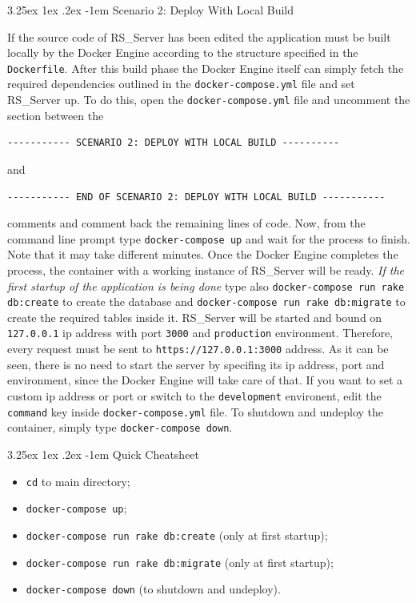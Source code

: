 \documentclass[a4paper, english]{article}
\makeatletter
\renewcommand\paragraph{\@startsection{paragraph}{5}{\z@}%
  {3.25ex \@plus1ex \@minus.2ex}%
  {-1em}%
  {\normalfont\normalsize\bfseries}}
\makeatother
\begin{document}
\paragraph{Scenario 2: Deploy With Local Build}

If the source code of RS\_Server has been edited the application must be built locally by the Docker Engine according to the structure specified in the \verb|Dockerfile|. After this build phase the Docker Engine itself can simply fetch the required dependencies outlined in the \verb|docker-compose.yml| file and set RS\_Server up. To do this, open the \verb|docker-compose.yml| file and uncomment the section between the 
\begin{verbatim}
----------- SCENARIO 2: DEPLOY WITH LOCAL BUILD ----------
\end{verbatim}
and 
\begin{verbatim}
----------- END OF SCENARIO 2: DEPLOY WITH LOCAL BUILD -----------
\end{verbatim} 
comments and comment back the remaining lines of code. Now, from the command line prompt type \verb|docker-compose up| and wait for the process to finish. Note that it may take different minutes. Once the Docker Engine completes the process, the container with a working instance of RS\_Server will be ready. \emph{If the first startup of the application is being done} type also \verb|docker-compose run rake db:create| to create the database and \verb|docker-compose run rake db:migrate| to create the required tables inside it. RS\_Server will be started and bound on \verb|127.0.0.1| ip address with port \verb|3000| and \verb|production| environment. Therefore, every request must be sent to \verb|https://127.0.0.1:3000| address. As it can be seen, there is no need to start the server by specifing its ip address, port and environment, since the Docker Engine will take care of that. If you want to set a custom ip address or port or switch to the \verb|development| environent, edit the \verb|command| key inside \verb|docker-compose.yml| file. To shutdown and undeploy the container, simply type \verb|docker-compose down|.

\paragraph{Quick Cheatsheet}

\begin{itemize}
\item \verb|cd| to main directory;
\item \verb|docker-compose up|;
\item \verb|docker-compose run rake db:create| (only at first startup);
\item \verb|docker-compose run rake db:migrate| (only at first startup);
\item \verb|docker-compose down| (to shutdown and undeploy).
\end{itemize}
\end{document}
